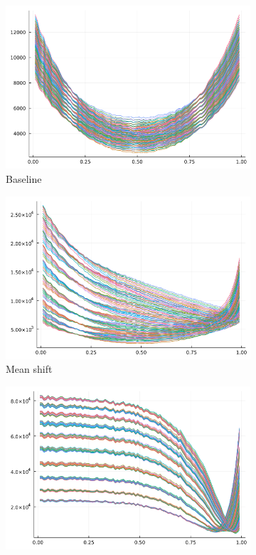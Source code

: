 \documentclass{article}
\begin{document}
\begin{figure}
    \centering
    \begin{subfigure}{0.45\textwidth}
        \includegraphics[width=\textwidth]{../plots/params/baseline/optimality_functions.png}
        \caption{Baseline}
    \end{subfigure}
    \begin{subfigure}{0.45\textwidth}
        \includegraphics[width=\textwidth]{../plots/params/a2-mean-shift/optimality_functions.png}
        \caption{Mean shift}
    \end{subfigure}
    \begin{subfigure}{0.45\textwidth}
        \includegraphics[width=\textwidth]{../plots/params/a2-meanvar-shift/optimality_functions.png}

\end{subfigure}
\end{figure}
\end{document}
